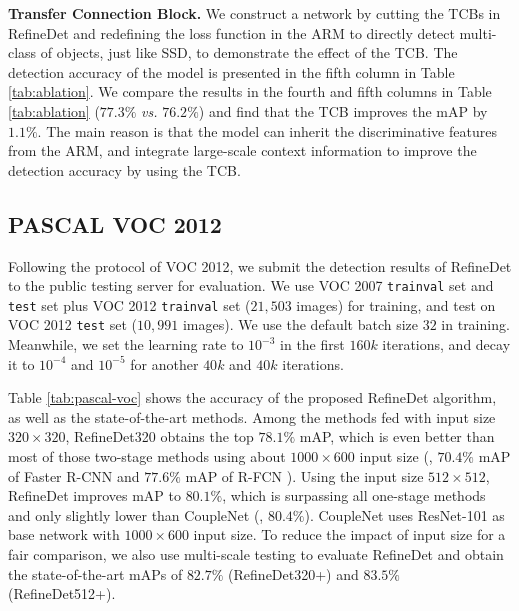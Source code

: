 \documentclass[10pt,twocolumn,letterpaper]{article}
\begin{document}
{\flushleft \textbf{Transfer Connection Block.}} We construct a network by cutting the TCBs in RefineDet and redefining the loss function in the ARM to directly detect multi-class of objects, just like SSD, to demonstrate the effect of the TCB. The detection accuracy of the model is presented in the fifth column in Table \ref{tab:ablation}. We compare the results in the fourth and fifth columns in Table \ref{tab:ablation} ($77.3\%$ {\it vs.} $76.2\%$) and find that the TCB improves the mAP by $1.1\%$. The main reason is that the model can inherit the discriminative features from the ARM, and integrate large-scale context information to improve the detection accuracy by using the TCB.



\subsection{PASCAL VOC 2012}
Following the protocol of VOC 2012, we submit the detection results of RefineDet to the public testing server for evaluation. We use VOC 2007 {\tt trainval} set and {\tt test} set plus VOC 2012 {\tt trainval} set ($21,503$ images) for training, and test on VOC 2012 {\tt test} set ($10,991$ images). We use the default batch size $32$ in training. Meanwhile, we set the learning rate to $10^{-3}$ in the first $160k$ iterations, and decay it to $10^{-4}$ and $10^{-5}$ for another $40k$ and $40k$ iterations.

Table \ref{tab:pascal-voc} shows the accuracy of the proposed RefineDet algorithm, as well as the state-of-the-art methods. Among the methods fed with input size $320\times320$, RefineDet320 obtains the top $78.1\%$ mAP, which is even better than most of those two-stage methods using about $1000\times600$ input size (\eg, $70.4\%$ mAP of Faster R-CNN \cite{DBLP:journals/pami/RenHG017} and $77.6\%$ mAP of R-FCN \cite{DBLP:conf/nips/DaiLHS16}). Using the input size $512\times512$, RefineDet improves mAP to $80.1\%$, which is surpassing all one-stage methods and only slightly lower than CoupleNet \cite{DBLP:conf/iccv/abs-1708-02863} (\ie, $80.4\%$). CoupleNet uses ResNet-101 as base network with $1000\times600$ input size. To reduce the impact of input size for a fair comparison, we also use multi-scale testing to evaluate RefineDet and obtain the state-of-the-art mAPs of $82.7\%$ (RefineDet320+) and $83.5\%$ (RefineDet512+).
\end{document}
